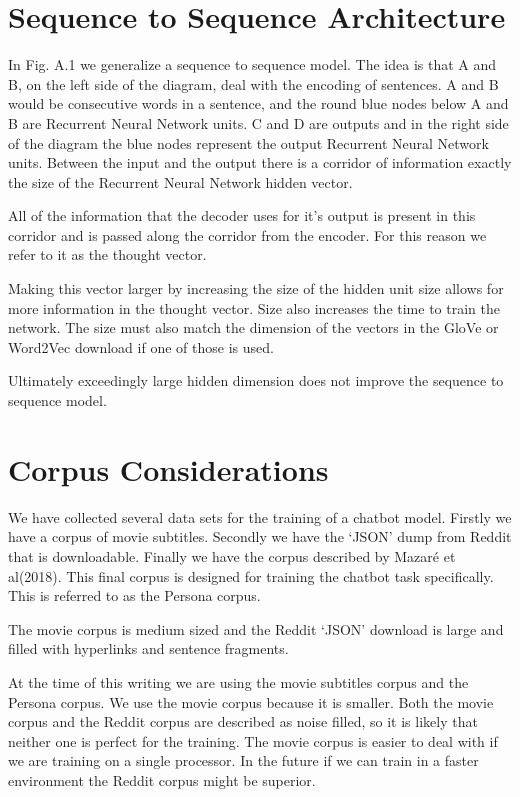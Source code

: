 \section{Sequence to Sequence Architecture}

In Fig. A.1 we generalize a sequence to sequence model. The idea is that A and B, on the left side of the diagram, deal with the encoding of sentences. A and B would be consecutive words in a sentence, and the round blue nodes below A and B are Recurrent Neural Network units. C and D are outputs and in the right side of the diagram the blue nodes represent the output Recurrent Neural Network units. Between the input and the output there is a corridor of information exactly the size of the Recurrent Neural Network hidden vector. 

All of the information that the decoder uses for it\textquoteright s output is present in this corridor and is passed along the corridor from the encoder. For this reason we refer to it as the thought vector.

Making this vector larger by increasing the size of the hidden unit size allows for more information in the thought vector. Size also increases the time to train the network. The size must also match the dimension of the vectors in the GloVe or Word2Vec download if
one of those is used. 

Ultimately exceedingly large hidden dimension does not improve the sequence to sequence model. 
\fi

\iffalse
\section{Corpus Considerations}
We have collected several data sets for the training of a chatbot model. Firstly we have a corpus of movie subtitles. Secondly we have the `JSON' dump from Reddit that is downloadable. Finally we have the corpus described by Mazar{\'{e}} et al(2018)\cite{DBLP:journals/corr/abs-1809-01984}. This final corpus is designed for training the chatbot task specifically. This is referred to as the Persona corpus.

The movie corpus is medium sized and the Reddit `JSON' download is large
and filled with hyperlinks and sentence fragments. 

At the time of
this writing we are using the movie subtitles corpus and the Persona corpus. We use the movie
corpus because it is smaller. Both the movie corpus and the Reddit
corpus are described as noise filled, so it is likely that neither
one is perfect for the training. The movie corpus is easier to deal
with if we are training on a single processor. In the future if we
can train in a faster environment the Reddit corpus might be superior.

